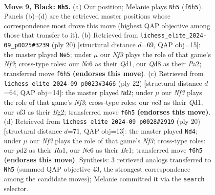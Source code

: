 \documentclass[11pt]{article}
\begin{document}
\clearpage

\begin{figure}[p]\centering
\begin{subfigure}{0.46\textwidth}\centering
\resizebox{\linewidth}{!}{%
\newchessgame
\chessboard[
  setfen={r1bq1rk1/pp1pppbp/2n2np1/2p5/2P5/P1N2NP1/1P1PPPBP/R1BQ1RK1 b - - 4 9},
  showmover=false,
  pgfstyle=straightmove, color=movearrow, markmove={f6-h5}
]}
\caption{}
\end{subfigure}\hfill
\begin{subfigure}{0.46\textwidth}\centering
\resizebox{\linewidth}{!}{%
\newchessgame
\chessboard[
  setfen={r1bq1rk1/2p1bppp/1p2pn2/n2p4/3P1B2/2N2NP1/PP2PPBP/R2Q1RK1 w - - 2 11},
  showmover=false,
  pgfstyle=straightmove, color=movearrow, markmove={f3-e5}
]}
\caption{}
\end{subfigure}
\\[4pt]
\begin{subfigure}{0.46\textwidth}\centering
\resizebox{\linewidth}{!}{%
\newchessgame
\chessboard[
  setfen={r1bq1rk1/1pp1bppp/4pn2/nN1p4/P2P4/5NP1/1BP1PPBP/R2Q1RK1 w - - 3 12},
  showmover=false,
  pgfstyle=straightmove, color=movearrow, markmove={f3-d2}
]}
\caption{}
\end{subfigure}\hfill
\begin{subfigure}{0.46\textwidth}\centering
\resizebox{\linewidth}{!}{%
\newchessgame
\chessboard[
  setfen={rnbq1rk1/1p2ppbp/p2p1np1/3P4/8/2N2NPP/PP2PPB1/R1BQ1RK1 w - - 0 11},
  showmover=false,
  pgfstyle=straightmove, color=movearrow, markmove={f3-d4}
]}
\caption{}
\end{subfigure}
\caption{\textbf{Move 9, Black: \texttt{Nh5}.} (a) Our position; Melanie plays \texttt{Nh5} (\texttt{f6h5}). Panels (b)--(d) are the retrieved master positions whose correspondence most drove this move (highest QAP objective among those that transfer to it). (b) Retrieved from \texttt{lichess\_elite\_2024-09\_p0025\#3239} (ply 20) [structural distance $d$=69, QAP obj=15]: the master played \texttt{Ne5}; under $\mu$ our \emph{Nf3} plays the role of that game's \emph{Nf3}; cross-type roles: our \emph{N}c6 as their \emph{Q}d1, our \emph{Q}d8 as their \emph{P}a2; transferred move \texttt{f6h5} \textbf{(endorses this move)}. (c) Retrieved from \texttt{lichess\_elite\_2024-09\_p0023\#3466} (ply 22) [structural distance $d$=64, QAP obj=14]: the master played \texttt{Nd2}; under $\mu$ our \emph{Nf3} plays the role of that game's \emph{Nf3}; cross-type roles: our \emph{n}c3 as their \emph{Q}d1, our \emph{n}f3 as their \emph{B}g2; transferred move \texttt{f6h5} \textbf{(endorses this move)}. (d) Retrieved from \texttt{lichess\_elite\_2024-09\_p0028\#2919} (ply 20) [structural distance $d$=71, QAP obj=13]: the master played \texttt{Nd4}; under $\mu$ our \emph{Nf3} plays the role of that game's \emph{Nf3}; cross-type roles: our \emph{p}d2 as their \emph{R}a1, our \emph{N}c6 as their \emph{B}c1; transferred move \texttt{f6h5} \textbf{(endorses this move)}. Synthesis: 3 retrieved analogs transferred to \texttt{Nh5} (summed QAP objective 43, the strongest correspondence among the candidate moves); Melanie committed it via the \texttt{search} selector.}
\label{fig:thought-m17}
\end{figure}
\end{document}
